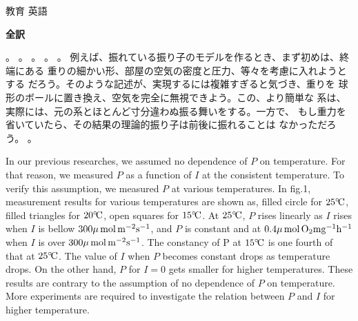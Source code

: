 \documentclass[fleqn]{jbook}
\begin{document}
\begin{answer}{教育 英語}{}
\begin{subanswers}
\SubAnswer

  {\bf 全訳}

  。
  。
  。
  。
  。
  例えば、振れている振り子のモデルを作るとき、まず初めは、終端にある
  重りの細かい形、部屋の空気の密度と圧力、等々を考慮に入れようとする
  だろう。そのような記述が、実現するには複雑すぎると気づき、重りを
  球形のボールに置き換え、空気を完全に無視できよう。この、より簡単な
  系は、実際には、元の系とほとんど寸分違わぬ振る舞いをする。一方で、
  もし重力を省いていたら、その結果の理論的振り子は前後に振れることは
  なかっただろう。
  。


\SubAnswer
\baselineskip=12pt
  \begin{subsubanswers}
  \SubSubAnswer
    In our previous researches, we assumed no dependence of $P$ on 
    temperature. For that reason, we measured $P$ as a function of
    $I$ at the consistent temperature. 
  \SubSubAnswer
    To verify this assumption, we measured $P$ at various temperatures.
  \SubSubAnswer
    In fig.1, measurement results for various temperatures are shown
    as, filled circle for $25^{\circ}\!\rm C$, filled triangles for $20^{\circ}\!\rm C$,
    open squares for $15^{\circ}\!\rm C$.
  \SubSubAnswer
    At $25^{\circ}\!\rm C$, $P$ rises linearly as $I$ rises when $I$ is bellow
    $300\mu\,{\rm mol\, m^{-2} s^{-1}}$, and $P$ is constant and at 
    $0.4\mu\,{\rm mol\, O_2 mg^{-1} h^{-1}}$ when $I$ is over 
    $300\mu\,{\rm mol\, m^{-2} s^{-1}}$.
  \SubSubAnswer
    The constancy of P at $15^{\circ}\!\rm C$ is one fourth of that at $25^{\circ}\!\rm C$.
  \SubSubAnswer
    The value of $I$ when $P$ becomes constant drops as temperature
    drops.
  \SubSubAnswer
    On the other hand, $P$ for $I=0$ gets smaller for higher
    temperatures.
  \SubSubAnswer
    These results are contrary to the assumption of no dependence of
    $P$ on temperature. 
  \SubSubAnswer
    More experiments are required to investigate the relation between
    $P$ and $I$ for higher temperature.
  \end{subsubanswers}


\end{subanswers}
\end{answer}
\end{document}
